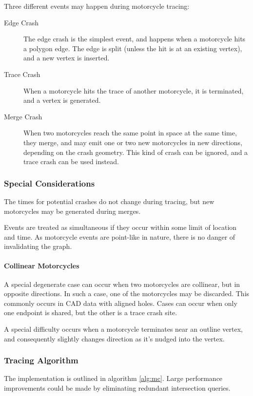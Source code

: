 \documentclass[12pt,a4paper,oneside,openany]{article}
\begin{document}
Three different events may happen during motorcycle tracing:
\begin{description}
\item[Edge Crash] The edge crash is the simplest event, and happens when a motorcycle hits a polygon edge. The edge is split (unless the hit is at an existing vertex), and a new vertex is inserted.
\item[Trace Crash] When a motorcycle hits the trace of another motorcycle, it is terminated, and a vertex is generated.
\item[Merge Crash] When two motorcycles reach the same point in space at the same time, they merge, and may emit one or two new motorcycles in new directions, depending on the crash geometry. This kind of crash can be ignored, and a trace crash can be used instead.
\end{description}


\subsubsection{Special Considerations}

The times for potential crashes do not change during tracing, but new motorcycles may be generated during merges.

Events are treated as simultaneous if they occur within some limit of location and time. As motorcycle events are point-like in nature, there is no danger of invalidating the graph.

\paragraph{Collinear Motorcycles}

A special degenerate case can occur when two motorcycles are collinear, but in opposite directions. In such a case, one of the motorcycles may be discarded. This commonly occurs in CAD data with aligned holes. Cases can occur when only one endpoint is shared, but the other is a trace crash site.

A special difficulty occurs when a motorcycle terminates near an outline vertex, and consequently slightly changes direction as it's nudged into the vertex.


\subsubsection{Tracing Algorithm}

The implementation is outlined in algorithm \ref{alg:mc}. Large performance improvements could be made by eliminating redundant intersection queries.
\end{document}
